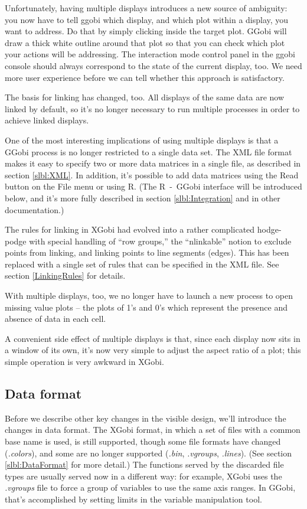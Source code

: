 \documentclass[11pt]{article}
\def\File#1{\textsl{#1}}
\begin{document}
{Unfortunately, having multiple displays introduces a new source of
ambiguity: you now have to tell ggobi which display, and which plot
within a display, you want to address.  Do that by simply clicking
inside the target plot.  GGobi will draw a thick white outline around
that plot so that you can check which plot your actions will be
addressing.  The interaction mode control panel in the ggobi console
should always correspond to the state of the current display, too.  We
need more user experience before we can tell whether this approach is
satisfactory.

The basis for linking has changed, too.  All displays of the same data
are now linked by default, so it's no longer necessary to run
multiple processes in order to achieve linked displays.

One of the most interesting implications of using multiple displays
is that a GGobi process is no longer restricted to a single data
set.  The XML file format makes it easy to specify two or more data
matrices in a single file, as described in section \ref{slbl:XML}.
In addition, it's possible to add data matrices using the Read button
on the File menu or using R.  (The R~-~GGobi interface will be
introduced below, and it's more fully described in section
\ref{slbl:Integration} and in other documentation.)

The rules for linking in XGobi had evolved into a rather complicated
hodge-podge with special handling of ``row groups,'' the
``nlinkable'' notion to exclude points from linking, and linking
points to line segments (edges).  This has been replaced with a single set
of rules that can be specified in the XML file.  See section 
\ref{LinkingRules} for details.

With multiple displays, too, we no longer have to launch a new
process to open missing value plots -- the plots of 1's and 0's
which represent the presence and absence of data in each cell.

A convenient side effect of multiple displays is that, since each
display now sits in a window of its own, it's now very simple to
adjust the aspect ratio of a plot; this simple operation is very
awkward in XGobi.

\subsection {Data format}

Before we describe other key changes in the visible design, we'll
introduce the changes in data format.  The XGobi format, in which a
set of files with a common base name is used, is still supported,
though some file formats have changed (\File{.colors}), and some are no
longer supported (\File{.bin}, \File{.vgroups}, \File{.lines}).  (See
section \ref{slbl:DataFormat} for more detail.) The functions served
by the discarded file types are usually served now in a different
way:  for example, XGobi uses the \File{.vgroups} file to force
a group of variables to use the same axis ranges.  In GGobi, that's
accomplished by setting limits in the variable manipulation tool.

}
\end{document}
